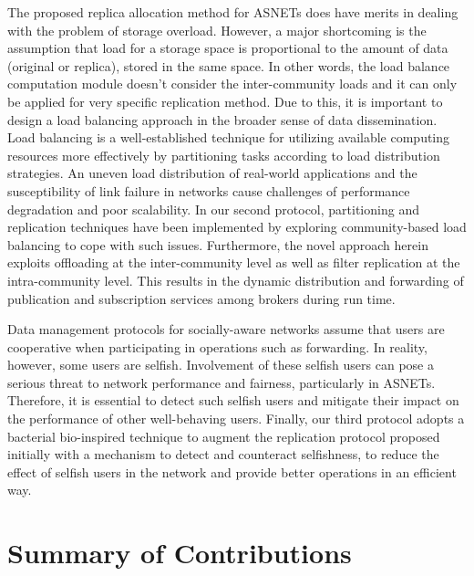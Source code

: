 The proposed replica allocation method for ASNETs does have merits in dealing with the problem of storage overload. However, a major shortcoming is the assumption that load for a storage space is proportional to the amount of data (original or replica), stored in the same space. In other words, the load balance computation module doesn't consider the inter-community loads and it can only be applied for very specific replication method. Due to this, it is important to design a load balancing approach in the broader sense of data dissemination. Load balancing is a well-established technique for utilizing available computing resources more effectively by partitioning tasks according to load distribution strategies. An uneven load distribution of real-world applications and the susceptibility of link failure in networks cause challenges of performance degradation and poor scalability. In our second protocol, partitioning and replication techniques have been implemented by exploring community-based load balancing to cope with such issues. Furthermore, the novel approach herein exploits offloading at the inter-community level as well as filter replication at the intra-community level. This results in the dynamic distribution and forwarding of publication and subscription services among brokers during run time.

Data management protocols for socially-aware networks assume that users are cooperative when participating in operations such as forwarding. In reality, however, some users are selfish.  Involvement of these selfish users can pose a serious threat to network performance and fairness, particularly in ASNETs. Therefore, it is essential to detect such selfish users and mitigate their impact on the performance of other well-behaving users. Finally, our third protocol adopts a bacterial bio-inspired technique to augment the replication protocol proposed initially with a mechanism to detect and counteract selfishness, to reduce the effect of selfish users in the network and provide better operations in an efficient way.

\section{Summary of Contributions}\label{Chap1_02}

